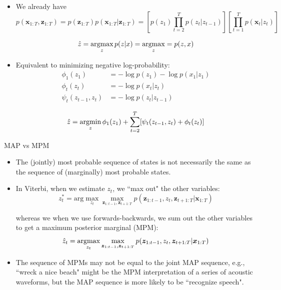 \documentclass[10pt,mathserif]{beamer}
\begin{document}
\begin{frame}
\begin{itemize}\footnotesize
    \item We already have 
    \begin{equation*}
        p(\bm{x}_{1:T}, \bm{z}_{1:T}) = p(\bm{z}_{1:T})p(\bm{x}_{1:T}|\bm{z}_{1:T})  = \left[ p(z_1) \prod_{t=2}^T p(z_t|z_{t-1}) \right] \left[ \prod_{t=1}^T p(\bm{x}_t|z_t)\right]
    \end{equation*}
    
    \begin{equation*}
        \hat{z} = \mathop{\rm argmax}_z p(z|x) = \mathop{\rm argmax}_z = p(z, x)
    \end{equation*}
    
    \item Equivalent to minimizing negative log-probability:
    \begin{equation*}
        \begin{split}
             \phi_1(z_1) & = - \log p(z_1) - \log p(x_1|z_1)\\
             \phi_t(z_t) & = - \log p(x_t|z_t) \\
             \psi_t(z_{t-1}, z_t) & = - \log p(z_t|z_{t - 1})
        \end{split}
    \end{equation*}
    
    \begin{equation*}
        \hat{z} = \mathop{\rm argmin}_z \phi_1(z_1) +  \sum_{t=2}^T [\psi_t(z_{t-1}, z_t) + \phi_t(z_t)]
    \end{equation*}    
\end{itemize}
\end{frame}

\begin{frame}{MAP vs MPM}
\begin{itemize}
    \item The (jointly) most probable sequence of states is not necessarily the same as the sequence of (marginally) most probable states.
    \item In Viterbi, when we estimate $z_t$, we ``max out" the other variables:
    \begin{equation*}
        z_t^* =\text{arg}\max_{z_t} \max_{\bm{z}_{1:t -1} ,\bm{z}_{t +1:T}} p(\bm{z}_{1:t -1},z_t,\bm{z}_{t+1:T}|\bm{x}_{1:T})
    \end{equation*}
    
    whereas we when we use forwards-backwards, we sum out the other variables to get a maximum posterior marginal (MPM):
    \begin{equation*}
        \hat{z}_t =\mathop{\rm argmax}_{z_t} \max_{\bm{z}_{1:t -1} ,\bm{z}_{t +1:T}} p(\bm{z}_{1:t -1},z_t,\bm{z}_{t+1:T}|\bm{x}_{1:T})
    \end{equation*}
    
    \item The sequence of MPMs may not be equal to the joint MAP sequence, e.g., ``wreck a nice beach" might be the MPM interpretation of a series of acoustic waveforms, but the MAP sequence is more likely to be ``recognize speech".
\end{itemize}
\end{frame}
\end{document}
